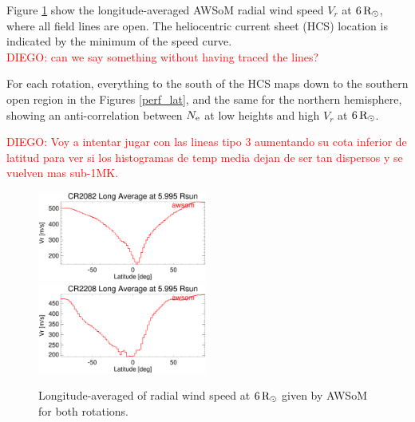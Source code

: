 \documentclass[namedreferences]{solarphysics}
\newcommand{\mrsun}{{\rm R_\odot}}
\newcommand{\Ne}{N_{\rm e}}
\def\diego#1{\textcolor{red}{DIEGO: #1}}
\begin{document}
\begin{article}



Figure \ref{perf_lon_vr} show the longitude-averaged AWSoM radial wind speed $V_r$ at $6\,\mrsun$, where all field lines are open. The heliocentric current sheet (HCS) location is indicated by the minimum of the speed curve.\\
\diego{can we say something without having traced the lines?}

For each rotation, everything to the south of the HCS maps down to the southern open region in the Figures \ref{perf_lat}, and the same for the northern hemisphere, showing an anti-correlation between $\Ne$ at low heights and high $V_r$ at $6\,\mrsun$.

\diego{Voy a intentar jugar con las lineas tipo 3 aumentando su cota inferior de latitud para ver si los histogramas de temp media dejan de ser tan dispersos y se vuelven mas sub-1MK. }


\begin{figure}[h!]
\begin{center}
\includegraphics[width=0.495\textwidth]{figs/Perfil_Vr_2082_5995.eps}
\includegraphics[width=0.495\textwidth]{figs/Perfil_Vr_2208_5995.eps}
\caption{Longitude-averaged of radial wind speed at $6\,\mrsun$ given by AWSoM for both rotations.}
\label{perf_lon_vr}
\end{center}
\end{figure}




\end{article}
\end{document}
